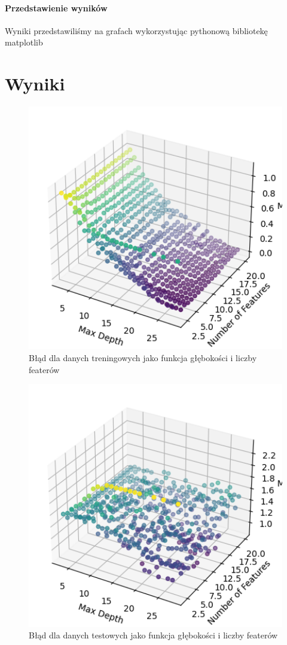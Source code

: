 \documentclass[12pt]{article}
\begin{document}
\paragraph{Przedstawienie wyników}
Wyniki przedstawiliśmy na grafach wykorzystując pythonową bibliotekę matplotlib 
\section{Wyniki}
\begin{figure}[H]
\caption{Błąd dla danych treningowych jako funkcja głębokości i liczby featerów}
\centering
\includegraphics[width=1.0\textwidth]{output.png}
\end{figure}
\begin{figure}[H]
\caption{Błąd dla danych testowych jako funkcja głębokości i liczby featerów}
\centering
\includegraphics[width=1.0\textwidth]{output2.png}
\end{figure}
\end{document}
